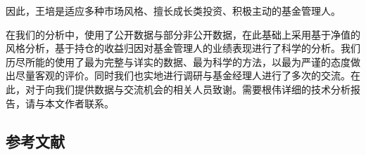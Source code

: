 \documentclass[journal=jacsat,manuscript=article]{achemso}
\begin{document}
因此，王培是适应多种市场风格、擅长成长类投资、积极主动的基金管理人。

\begin{acknowledgement}

在我们的分析中，使用了公开数据与部分非公开数据，在此基础上采用基于净值的风格分析，基于持仓的收益归因对基金管理人的业绩表现进行了科学的分析。我们历尽所能的使用了最为完整与详实的数据、最为科学的方法，以最为严谨的态度做出尽量客观的评价。同时我们也实地进行调研与基金经理人进行了多次的交流。在此，对于向我们提供数据与交流机会的相关人员致谢。需要根伟详细的技术分析报告，请与本文作者联系。

\end{acknowledgement}

\subsection{参考文献}
\end{document}
